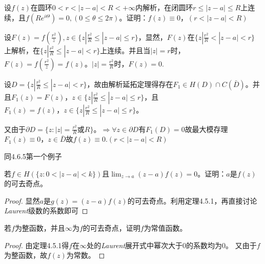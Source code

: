 \begin{eg}
	\color{blue}设$f(z)$在圆环$0<r<|z-a|<R<+\infty$内解析，在闭圆环$r\le |z-a|\le R$上连续，且$f(Re^{i\Theta} )=0,(0\le \theta \le 2\pi)$。证明：$f(z)\equiv 0，(r<|z-a|<R)$
	\color{black}
	\begin{jie}{1}
		
		
		设$F(z)=f(\frac{r^{2}}{\bar{z}}),z\in \{z|\frac{r^{2}}{R} \le |z-a|\le r\}$，显然，$F(z)$在$\{z|\frac{r^{2}}{R} < |z-a|< r\}$
		上解析，在$\{z|\frac{r^{2}}{R} \le |z-a|< r\}$上连续。并且当$|z|=r$时，$F(z)=f(\frac{r^{2}}{\bar{z}})=f(z)$。$|z|=\frac{r^{2}}{R}$时，$F(z)=0$.
		
		设$D=\{z|\frac{r^{2}}{R} \le |z-a| < r\}$，故由解析延拓定理得存在$F_{1}\in H(D)\cap C(\bar{D})$。并且$F_{1}(z)=F(z)，z\in \{z|\frac{r^{2}}{R} \le |z-a|\le r\}$，且$F_{1}(z)=f(z)，z\in \{z|\frac{r^{2}}{R} \le |z-a|\le r\}$。
		
		又由于$\partial D =\{ z:|z|=\frac{r^{2}}{R} $或$R\}$。$\Rightarrow \forall z \in \partial D$有$F_{1}(D)=0$故最大模存理$F_{1}(z)\equiv 0 ，z\in \bar{D}$故$f(z)\equiv 0.(r<|z-a|<R)$
	\end{jie}
	\begin{jie}{2}
		
		
		同4.6.5第一个例子
	\end{jie}
\end{eg}
\begin{eg}
	\color{blue}若$f\in H(\{ z:0<|z-a|<k\}  )$且$\displaystyle\lim_{z \rightarrow a}(z-a)f(z)=0$。证明：$a$是$f(z)$的可去奇点。
	
	\color{black}
	\begin{proof}
	显然$a$是$g(z)=(z-a)f(z)$的可去奇点。利用定理4.5.1，再直接讨论\emph{Laurent}级数的系数即可
	\end{proof}

\end{eg}
\begin{eg}
	\color{blue}若$f$为整函数，并且$\infty$为$f$的可去奇点，证明$f$为常值函数。
	
	\color{black}
	\begin{proof}
	由定理4.5.1得$f$在$\infty$处的\emph{Laurent}展开式中幂次大于0的系数均为0。
	又由于$f$为整函数，故$f(z)$为常数。
	\end{proof}
\end{eg}
